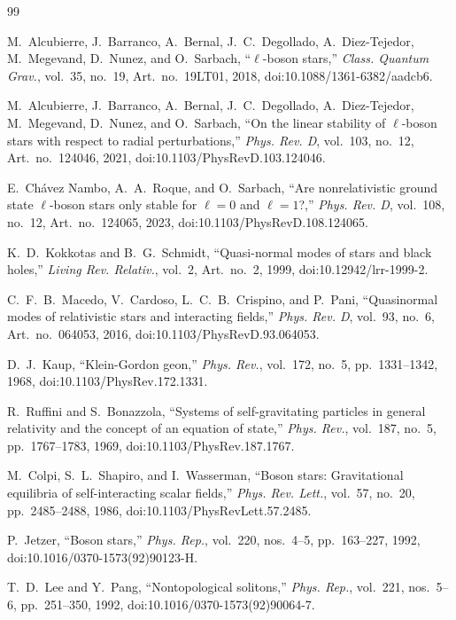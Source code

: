 \documentclass[aps,prd,preprint,onecolumn,nofootinbib,superscriptaddress,showkeys]{revtex4-2}
\begin{document}
\fi
\begin{thebibliography}{99}

M.~Alcubierre, J.~Barranco, A.~Bernal, J.~C.~Degollado, A.~Diez-Tejedor, M.~Megevand, D.~Nunez, and O.~Sarbach,
``$\ell$-boson stars,''
\emph{Class. Quantum Grav.}, vol.~35, no.~19, Art.~no.~19LT01, 2018,
doi:10.1088/1361-6382/aadcb6.

M.~Alcubierre, J.~Barranco, A.~Bernal, J.~C.~Degollado, A.~Diez-Tejedor, M.~Megevand, D.~Nunez, and O.~Sarbach,
``On the linear stability of $\ell$-boson stars with respect to radial perturbations,''
\emph{Phys. Rev. D}, vol.~103, no.~12, Art.~no.~124046, 2021,
doi:10.1103/PhysRevD.103.124046.

E.~Ch\'avez Nambo, A.~A.~Roque, and O.~Sarbach,
``Are nonrelativistic ground state $\ell$-boson stars only stable for
$\ell=0$ and $\ell=1$?,''
\emph{Phys. Rev. D}, vol.~108, no.~12, Art.~no.~124065, 2023,
doi:10.1103/PhysRevD.108.124065.

K.~D.~Kokkotas and B.~G.~Schmidt,
``Quasi-normal modes of stars and black holes,''
\emph{Living Rev. Relativ.}, vol.~2, Art.~no.~2, 1999,
doi:10.12942/lrr-1999-2.

C.~F.~B.~Macedo, V.~Cardoso, L.~C.~B.~Crispino, and P.~Pani,
``Quasinormal modes of relativistic stars and interacting fields,''
\emph{Phys. Rev. D}, vol.~93, no.~6, Art.~no.~064053, 2016,
doi:10.1103/PhysRevD.93.064053.

D.~J.~Kaup,
``Klein-Gordon geon,''
\emph{Phys. Rev.}, vol.~172, no.~5, pp.~1331--1342, 1968,
doi:10.1103/PhysRev.172.1331.

R.~Ruffini and S.~Bonazzola,
``Systems of self-gravitating particles in general relativity and the concept of an equation of state,''
\emph{Phys. Rev.}, vol.~187, no.~5, pp.~1767--1783, 1969,
doi:10.1103/PhysRev.187.1767.

M.~Colpi, S.~L.~Shapiro, and I.~Wasserman,
``Boson stars: Gravitational equilibria of self-interacting scalar fields,''
\emph{Phys. Rev. Lett.}, vol.~57, no.~20, pp.~2485--2488, 1986,
doi:10.1103/PhysRevLett.57.2485.

P.~Jetzer,
``Boson stars,''
\emph{Phys. Rep.}, vol.~220, nos.~4--5, pp.~163--227, 1992,
doi:10.1016/0370-1573(92)90123-H.

T.~D.~Lee and Y.~Pang,
``Nontopological solitons,''
\emph{Phys. Rep.}, vol.~221, nos.~5--6, pp.~251--350, 1992,
doi:10.1016/0370-1573(92)90064-7.


\end{thebibliography}
\end{document}
